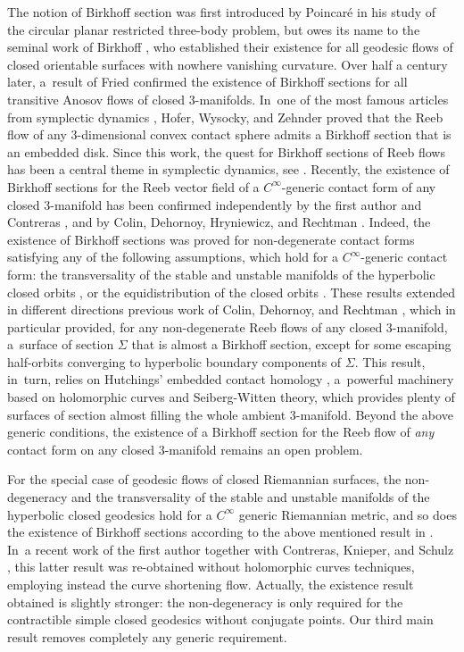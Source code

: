 The notion of Birkhoff section was first introduced by Poincaré in his study of the circular planar restricted three-body problem, but owes its name to the seminal work of Birkhoff \cite{Birkhoff:1917aa}, who established their existence for all geodesic flows of closed orientable surfaces with nowhere vanishing curvature. Over half a century later, a~result of Fried \cite{Fried:1983aa} confirmed the existence of Birkhoff sections for all transitive Anosov flows of closed 3-manifolds. In~one of the most famous articles from symplectic dynamics \cite{Hofer:1998aa}, Hofer, Wysocky, and Zehnder proved that the Reeb flow of any 3-dimensional convex contact sphere admits a Birkhoff section that is an embedded disk. Since this work, the quest for Birkhoff sections of Reeb flows has been a central theme in symplectic dynamics, see \eg \cite{Salomao:2018aa, Hryniewicz:2023aa}. Recently, the existence of Birkhoff sections for the Reeb vector field of a $C^\infty$-generic contact form of any closed 3\nobreakdash-manifold has been confirmed independently by the first author and Contreras \cite{Contreras:2022aa}, and by Colin, Dehornoy, Hryniewicz, and Rechtman \cite{Colin:2024aa}. Indeed, the existence of Birkhoff sections was proved for non-degenerate contact forms satisfying any of the following assumptions, which hold for a $C^\infty$-generic contact form: the transversality of the stable and unstable manifolds of the hyperbolic closed orbits \cite{Contreras:2022aa}, or the equidistribution of the closed orbits \cite{Colin:2024aa}. These results extended in different directions previous work of Colin, Dehornoy, and Rechtman \cite{Colin:2023aa}, which in particular provided, for any non-degenerate Reeb flows of any closed 3-manifold, a~surface of section $\Sigma$ that is almost a Birkhoff section, except for some escaping half-orbits converging to hyperbolic boundary components of $\Sigma$. This result, in~turn, relies on Hutchings' embedded contact homology \cite{Hutchings:2014vp}, a~powerful machinery based on holomorphic curves and Seiberg-Witten theory, which provides plenty of surfaces of section almost filling the whole ambient 3-manifold. Beyond the above generic conditions, the existence of a Birkhoff section for the Reeb flow of \emph{any} contact form on any closed 3-manifold remains an open problem.

For the special case of geodesic flows of closed Riemannian surfaces, the non-degeneracy and the transversality of the stable and unstable manifolds of the hyperbolic closed geodesics hold for a $C^\infty$ generic Riemannian metric, and so does the existence of Birkhoff sections according to the above mentioned result in \cite{Contreras:2022aa}. In~a recent work of the first author together with Contreras, Knieper, and Schulz \cite{Contreras:2022ab}, this latter result was re-obtained without holomorphic curves techniques, employing instead the curve shortening flow. Actually, the existence result obtained is slightly stronger: the non-degeneracy is only required for the contractible simple closed geodesics without conjugate points. Our third main result removes completely any generic requirement.


